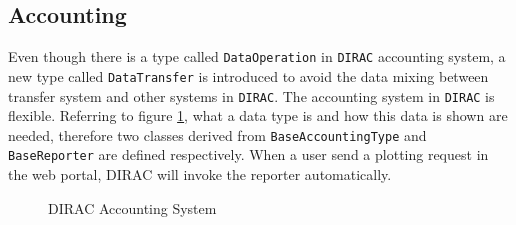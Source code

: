 \subsection{Accounting}

Even though there is a type called {\tt DataOperation} in {\tt DIRAC}
accounting system, a new type called {\tt DataTransfer}
is introduced to avoid the data mixing between transfer system
and other systems in {\tt DIRAC}.
The accounting system 
in {\tt DIRAC} is flexible. Referring to figure \ref{fig:acct},
what a data type is and how this data is shown
are needed,
therefore two classes derived from {\tt BaseAccountingType}
and {\tt BaseReporter} are defined respectively.
When a user send a plotting request in the web portal, 
DIRAC will invoke the reporter automatically.
\begin{figure}[htbp]
    
    \caption{\label{fig:acct}DIRAC Accounting System}
\end{figure}
